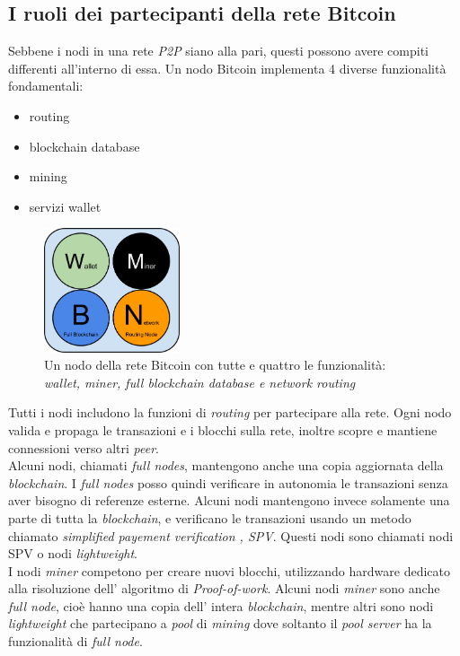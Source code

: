\subsection{I ruoli dei partecipanti della rete Bitcoin}
Sebbene i nodi in una rete \textit{P2P} siano alla pari, questi possono avere compiti differenti all'interno di essa. Un nodo Bitcoin implementa 4 diverse funzionalit\`a fondamentali:
\begin{itemize}
\item routing 
\item blockchain database
\item mining
\item servizi wallet
\end{itemize}
\begin{figure}[htb]
\begin{center}
   \includegraphics[width=0.355\textwidth]{imgs/4Funzioni.png}
   \caption{Un nodo della rete Bitcoin con tutte e quattro le funzionalit\`a: \textit{wallet, miner, full blockchain database e network routing}}
   \end{center}
   \hfill
\end{figure}
Tutti i nodi includono la funzioni di \textit{routing} per partecipare alla rete. Ogni nodo valida e propaga le transazioni e i blocchi sulla rete, inoltre scopre e mantiene connessioni verso altri \textit{peer}.\\
Alcuni nodi, chiamati \textit{full nodes}, mantengono anche una copia aggiornata della \textit{blockchain}. I \textit{full nodes} posso quindi verificare in autonomia le transazioni senza aver bisogno di referenze esterne. Alcuni nodi mantengono invece solamente una parte di tutta la \textit{blockchain}, e verificano le transazioni usando un metodo chiamato \textit{simplified payement verification , SPV}. Questi nodi sono chiamati nodi SPV o nodi \textit{lightweight}.\\
I nodi \textit{miner} competono per creare nuovi blocchi, utilizzando hardware dedicato alla risoluzione dell' algoritmo di \textit{Proof-of-work}. Alcuni nodi \textit{miner} sono anche \textit{full node}, cio\`e hanno una copia dell' intera \textit{blockchain}, mentre altri sono nodi \textit{lightweight} che partecipano a \textit{pool} di \textit{mining} dove soltanto il \textit{pool server} ha la funzionalit\`a di \textit{full node}.\\


